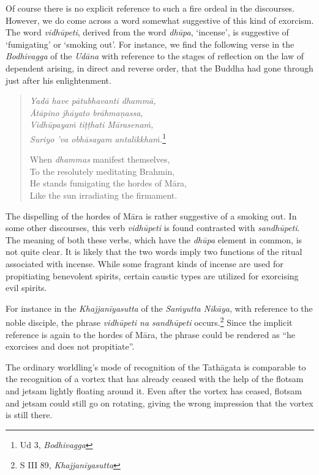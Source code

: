 Of course there is no explicit reference to such a fire ordeal in the discourses. However, we do come across a word somewhat suggestive of this kind of exorcism. The word \emph{vidhūpeti}, derived from the word \emph{dhūpa}, `incense', is suggestive of `fumigating' or `smoking out'. For instance, we find the following verse in the \emph{Bodhivagga} of the \emph{Udāna} with reference to the stages of reflection on the law of dependent arising, in direct and reverse order, that the Buddha had gone through just after his enlightenment.

\begin{quote}
\emph{Yadā have pātubhavanti dhammā,}\\
\emph{Ātāpino jhāyato brāhmaṇassa,}\\
\emph{Vidhūpayaṁ tiṭṭhati Mārasenaṁ,}\\
\emph{Suriyo 'va obhāsayam antalikkhaṁ.}\footnote{Ud 3, \emph{Bodhivagga}}

\clearpage

When \emph{dhammas} manifest themselves,\\
To the resolutely meditating Brahmin,\\
He stands fumigating the hordes of Māra,\\
Like the sun irradiating the firmament.
\end{quote}

The dispelling of the hordes of Māra is rather suggestive of a smoking out. In some other discourses, this verb \emph{vidhūpeti} is found contrasted with \emph{sandhūpeti}. The meaning of both these verbs, which have the \emph{dhūpa} element in common, is not quite clear. It is likely that the two words imply two functions of the ritual associated with incense. While some fragrant kinds of incense are used for propitiating benevolent spirits, certain caustic types are utilized for exorcising evil spirits.

For instance in the \emph{Khajjanīyasutta} of the \emph{Saṁyutta Nikāya}, with reference to the noble disciple, the phrase \emph{vidhūpeti na sandhūpeti} occurs.\footnote{S III 89, \emph{Khajjanīyasutta}} Since the implicit reference is again to the hordes of Māra, the phrase could be rendered as ``he exorcises and does not propitiate''.

The ordinary worldling's mode of recognition of the Tathāgata is comparable to the recognition of a vortex that has already ceased with the help of the flotsam and jetsam lightly floating around it. Even after the vortex has ceased, flotsam and jetsam could still go on rotating, giving the wrong impression that the vortex is still there.

